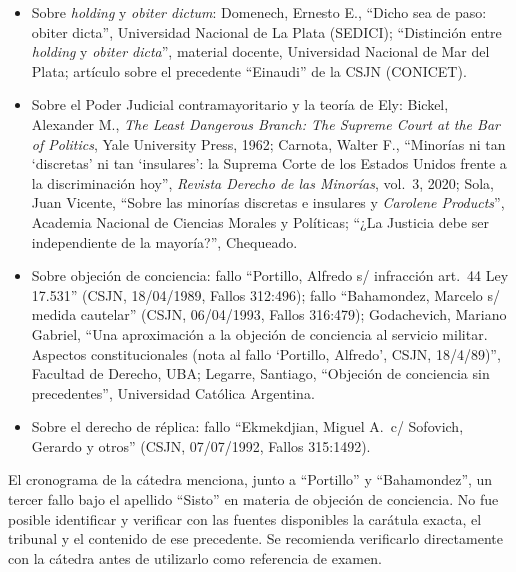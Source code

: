 \documentclass[12pt,oneside]{book}
\begin{document}
\begin{itemize}[leftmargin=1.4em]
  \item Sobre \textit{holding} y \textit{obiter dictum}: Domenech, Ernesto E.,
  ``Dicho sea de paso: obiter dicta'', Universidad Nacional de La Plata
  (SEDICI); ``Distinción entre \textit{holding} y \textit{obiter dicta}'',
  material docente, Universidad Nacional de Mar del Plata; artículo sobre el
  precedente ``Einaudi'' de la CSJN (CONICET).
  \item Sobre el Poder Judicial contramayoritario y la teoría de Ely: Bickel,
  Alexander M., \textit{The Least Dangerous Branch: The Supreme Court at the Bar
  of Politics}, Yale University Press, 1962; Carnota, Walter F., ``Minorías ni
  tan `discretas' ni tan `insulares': la Suprema Corte de los Estados Unidos
  frente a la discriminación hoy'', \textit{Revista Derecho de las Minorías},
  vol.\ 3, 2020; Sola, Juan Vicente, ``Sobre las minorías discretas e insulares y
  \textit{Carolene Products}'', Academia Nacional de Ciencias Morales y
  Políticas; ``¿La Justicia debe ser independiente de la mayoría?'', Chequeado.
  \item Sobre objeción de conciencia: fallo ``Portillo, Alfredo s/ infracción
  art.\ 44 Ley 17.531'' (CSJN, 18/04/1989, Fallos 312:496); fallo ``Bahamondez,
  Marcelo s/ medida cautelar'' (CSJN, 06/04/1993, Fallos 316:479); Godachevich,
  Mariano Gabriel, ``Una aproximación a la objeción de conciencia al servicio
  militar. Aspectos constitucionales (nota al fallo `Portillo, Alfredo',
  CSJN, 18/4/89)'', Facultad de Derecho, UBA; Legarre, Santiago, ``Objeción de
  conciencia sin precedentes'', Universidad Católica Argentina.
  \item Sobre el derecho de réplica: fallo ``Ekmekdjian, Miguel A.\ c/ Sofovich,
  Gerardo y otros'' (CSJN, 07/07/1992, Fallos 315:1492).
\end{itemize}

\begin{notebox}
El cronograma de la cátedra menciona, junto a ``Portillo'' y ``Bahamondez'', un
tercer fallo bajo el apellido ``Sisto'' en materia de objeción de conciencia. No
fue posible identificar y verificar con las fuentes disponibles la carátula
exacta, el tribunal y el contenido de ese precedente. Se recomienda verificarlo
directamente con la cátedra antes de utilizarlo como referencia de examen.
\end{notebox}
\end{document}
